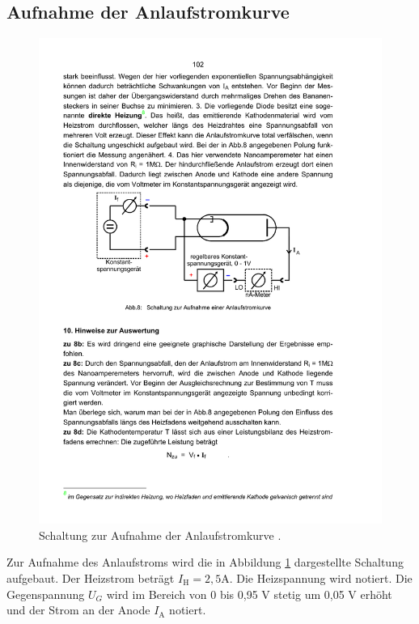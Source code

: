 \subsection{Aufnahme der Anlaufstromkurve}
\label{sec:anlauf}
\begin{figure}
  \centering
  \includegraphics[scale=0.6]{content/aufbau2.pdf}
\caption{Schaltung zur Aufnahme der Anlaufstromkurve \cite{anleitung504}.}
  \label{fig:aufbau2}
\end{figure}

Zur Aufnahme des Anlaufstroms wird die in Abbildung \ref{fig:aufbau2} dargestellte Schaltung aufgebaut. Der Heizstrom beträgt $I_\mathrm{H} = 2,5 \si{\ampere}$. Die Heizspannung wird notiert. Die Gegenspannung $U_G$ wird im Bereich von 0 bis 0,95 \si{\volt} stetig um 0,05 \si{\volt} erhöht und der Strom an der Anode $I_\mathrm{A}$ notiert.
